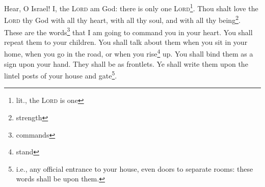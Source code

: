 
\begin{enumerate*}[mode=unboxed]
     Hear, O Israel! I, the \textsc{Lord} am God: there is only one \textsc{Lord}\footnote{lit., the \textsc{Lord} is one}.%
     Thou shalt love the \textsc{Lord} thy God with all thy heart, with all thy soul, and with all thy being\footnote{strength}.%
     These are the words\footnote{commands} that I am going to command you in your heart.%
     You shall repeat them to your children. You shall talk about them when you sit in your home, when you go in the road, or when you rise\footnote{stand} up.%
     You shall bind them as a sign upon your hand. They shall be as frontlets.%
     Ye shall write them upon the lintel posts of your house and gate\footnote{i.e., any official entrance to your house, even doors to separate rooms: these words shall be upon them.}.%
\end{enumerate*}
